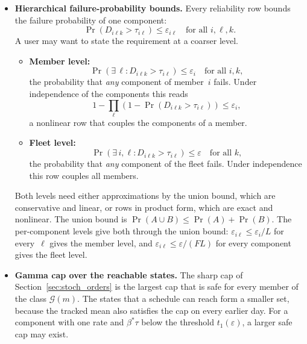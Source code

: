 \documentclass[11pt,a4paper]{article}
\theoremstyle{plain}
\theoremstyle{definition}
\theoremstyle{remark}
\begin{document}
\begin{itemize}
  \item \textbf{Hierarchical failure-probability bounds.}
    Every reliability row bounds the failure probability of one component:
    \begin{equation}
      \Pr(D_{i\ell k} > \tau_{i\ell}) \le \varepsilon_{i\ell} \quad \text{for all } i, \ell, k.
    \end{equation}
    A user may want to state the requirement at a coarser level.
    \begin{itemize}
      \item \textbf{Member level:}
        \begin{equation}
          \Pr(\exists\,\ell : D_{i\ell k} > \tau_{i\ell}) \le \varepsilon_i \quad \text{for all } i, k,
        \end{equation}
        the probability that \emph{any} component of member~$i$ fails.
        Under independence of the components this reads
        \begin{equation}
          1 - \prod_\ell (1 - \Pr(D_{i\ell k} > \tau_{i\ell})) \le \varepsilon_i,
        \end{equation}
        a nonlinear row that couples the components of a member.
      \item \textbf{Fleet level:}
        \begin{equation}
          \Pr(\exists\,i,\ell : D_{i\ell k} > \tau_{i\ell}) \le \varepsilon \quad \text{for all } k,
        \end{equation}
        the probability that \emph{any} component of the fleet fails.
        Under independence this row couples all members.
    \end{itemize}
    Both levels need either approximations by the union bound, which are conservative and linear, or rows in product form, which are exact and nonlinear.
    The union bound is $\Pr(A \cup B) \le \Pr(A) + \Pr(B)$.
    The per-component levels give both through the union bound: $\varepsilon_{i\ell} \le \varepsilon_i/L$ for every~$\ell$ gives the member level, and $\varepsilon_{i\ell} \le \varepsilon/(FL)$ for every component gives the fleet level.
  \item \textbf{Gamma cap over the reachable states.}
    The sharp cap of Section~\ref{sec:stoch_orders} is the largest cap that is safe for every member of the class $\mathcal{G}(m)$.
    The states that a schedule can reach form a smaller set, because the tracked mean also satisfies the cap on every earlier day.
    For a component with one rate and $\beta^*\tau$ below the threshold $t_1(\varepsilon)$, a larger safe cap may exist.

\end{itemize}
\end{document}
